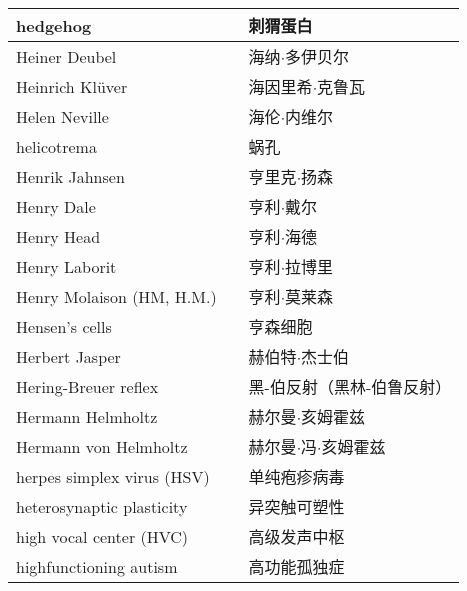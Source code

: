 \begin{longtable}{lll}
	\midrule
	hedgehog    &&  刺猬蛋白  \\
	
	\midrule
	Heiner Deubel    &&  海纳$\cdot$多伊贝尔  \\
	
	\midrule
	Heinrich Klüver    &&  海因里希$\cdot$克鲁瓦  \\
	
	\midrule
	Helen Neville    &&  海伦$\cdot$内维尔  \\
	
	\midrule
	helicotrema    &&  蜗孔  \\
	
	\midrule
	Henrik Jahnsen    &&  亨里克$\cdot$扬森  \\
	
	\midrule
	Henry Dale    &&  亨利$\cdot$戴尔  \\
	
	\midrule
	Henry Head    &&  亨利$\cdot$海德  \\
	
	\midrule
	Henry Laborit    &&  亨利$\cdot$拉博里  \\
	
	\midrule
	Henry Molaison (HM, H.M.)   &&  亨利$\cdot$莫莱森  \\
	
	\midrule
	Hensen's cells   &&  亨森细胞  \\
	
	\midrule
	Herbert Jasper     &&  赫伯特$\cdot$杰士伯  \\
	
	\midrule
	Hering-Breuer reflex     &&  黑-伯反射（黑林-伯鲁反射）  \\
	
	\midrule
	Hermann Helmholtz     &&  赫尔曼$\cdot$亥姆霍兹 \\
	
	\midrule
	Hermann von Helmholtz     &&  赫尔曼$\cdot$冯$\cdot$亥姆霍兹 \\
	
	\midrule
	herpes simplex virus (HSV)   &&  单纯疱疹病毒 \\
	
	\midrule
	heterosynaptic plasticity   &&  异突触可塑性 \\
	
	\midrule
	high vocal center (HVC)    &&  高级发声中枢  \\
	
	\midrule
	highfunctioning autism     &&  高功能孤独症  \\
	

\end{longtable}
